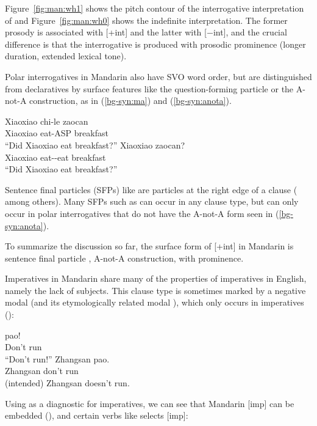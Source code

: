  Figure~\ref{fig:man:wh1} shows the pitch contour of the interrogative interpretation of \twh{} and Figure~\ref{fig:man:wh0} shows the indefinite interpretation. The former prosody is associated with [+int] and the latter with [$-$int], and the crucial difference is that the interrogative  is produced with prosodic prominence (longer duration, extended lexical tone). 

Polar interrogatives in Mandarin also have SVO word order, but are distinguished from declaratives by surface features like the question-forming particle  or the A-not-A construction, as in (\ref{bg-syn:ma}) and (\ref{bg-syn:anota}).

\gll Xiaoxiao	chi-le	zaocan		\\
Xiaoxiao	eat-ASP	breakfast	\Sfp{}\\
``Did Xiaoxiao eat breakfast?''
\eex
{}
\gll Xiaoxiao		zaocan?\\
	Xiaoxiao	eat-\Neg-eat	breakfast\\
	``Did Xiaoxiao eat breakfast?''
\eex


Sentence final particles (SFPs) like \ma{} are  particles at the right edge of a clause (\citealt{chao1968, zhudexi, huang1982, cheng1991, liboya2006} among others). Many SFPs such as  can occur in any clause type, but \ma{} can only occur in polar interrogatives that do not have the A-not-A form seen in (\ref{bg-syn:anota}). 




To summarize the discussion so far, the surface form of [+int] in Mandarin is sentence final particle \ma{}, A-not-A construction, \twh{} with prominence. 

Imperatives in Mandarin share many of the properties of imperatives in English, namely the lack of subjects. This clause type is sometimes marked by a negative modal  (and its etymologically related modal ), which only occurs in imperatives (\cite{chao1968, lithompson}):

\gll {} pao!\\
Don't run\\
``Don't run!''
\ex 
\gll *Zhangsan  pao.\\
Zhangsan don't run\\
(intended) Zhangsan doesn't run.
\exl
\eex 

Using  as a diagnostic for imperatives, we can see that Mandarin [imp] can be embedded (\cite{lithompson, chen2005imp}), and certain verbs like  selects [imp]:

